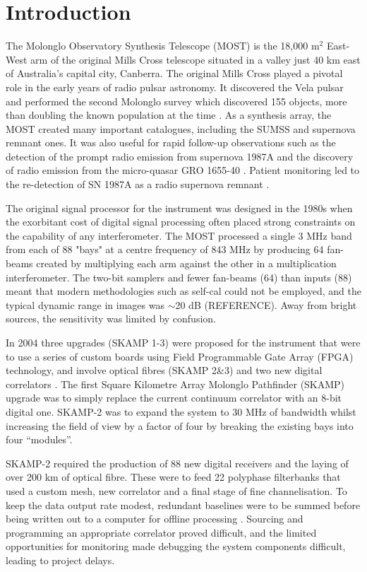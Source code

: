 \section{Introduction} 
The Molonglo Observatory Synthesis Telescope (MOST) is the 18,000 m$^2$ East-West arm of the original Mills Cross telescope situated in a valley just 40 km east of Australia's capital city, Canberra. The original Mills Cross played a pivotal role in the early years of radio pulsar astronomy. It discovered the Vela pulsar \citep{LARGE_1968} and performed the second Molonglo survey which discovered 155 objects, more than doubling the known population at the time \citep{Manchester_1978}. As a synthesis array, the MOST created many important catalogues, including the SUMSS \citep{Bock_1999,Mauch_2003} and supernova remnant \citep{Whiteoak_1996} ones. It was also useful for rapid follow-up observations such as the detection of the prompt radio emission from supernova 1987A \citep{Turtle_1987} and the discovery of radio emission from the micro-quasar GRO 1655-40 \citep{Tingay_1995}. Patient monitoring led to the re-detection of SN 1987A as a radio supernova remnant \citep{Staveley_Smith_1992}.

The original signal processor \citep{Robertson_1991} for the instrument was designed in the 1980s when the exorbitant cost of digital signal processing often placed strong constraints on the capability of any interferometer. The MOST processed a single 3 MHz band from each of 88 "bays" at a centre frequency of 843 MHz by producing 64 fan-beams created by multiplying each arm against the other in a multiplication interferometer. The two-bit samplers and fewer fan-beams (64) than inputs (88) meant that modern methodologies such as self-cal could not be employed, and the typical dynamic range in images was $\sim$20 dB (REFERENCE). Away from bright sources, the sensitivity was limited by confusion.

In 2004 three upgrades (SKAMP 1-3) were proposed for the instrument that were to use a series of custom boards using Field Programmable Gate Array (FPGA) technology, and involve optical fibres (SKAMP 2\&3) and two new digital correlators \citep{Adams_2004}. The first Square Kilometre Array Molonglo Pathfinder (SKAMP) upgrade was to simply replace the current continuum correlator with an 8-bit digital one. SKAMP-2 was to expand the system to 30 MHz of bandwidth whilst increasing the field of view by a factor of four by breaking the existing bays into four ``modules''.

SKAMP-2 required the production of 88 new digital receivers and the laying of over 200 km of optical fibre. These were to feed 22 polyphase filterbanks that used a custom mesh, new correlator and a final stage of fine channelisation. To keep the data output rate modest, redundant baselines were to be summed before being written out to a computer for offline processing \citep{Adams_2004}. Sourcing and programming an appropriate correlator proved difficult, and the limited opportunities for monitoring made debugging the system components difficult, leading to project delays.

